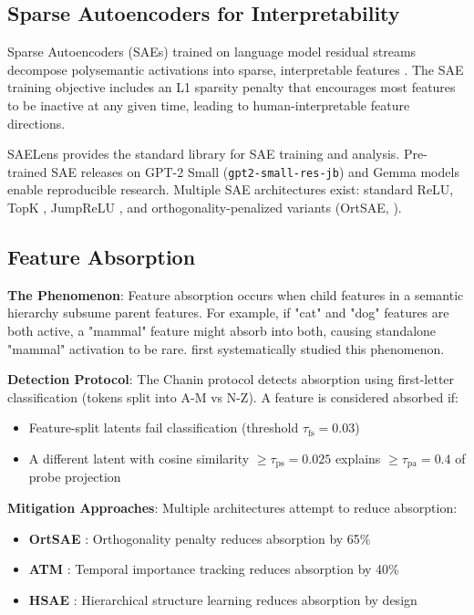 \documentclass{article}
\begin{document}
\subsection{Sparse Autoencoders for Interpretability}

Sparse Autoencoders (SAEs) trained on language model residual streams decompose polysemantic activations into sparse, interpretable features \citep{cunningham2023sparse, bricken2023training}. The SAE training objective includes an L1 sparsity penalty that encourages most features to be inactive at any given time, leading to human-interpretable feature directions.

SAELens \citep{bloom2024saelens} provides the standard library for SAE training and analysis. Pre-trained SAE releases on GPT-2 Small (\texttt{gpt2-small-res-jb}) and Gemma models enable reproducible research. Multiple SAE architectures exist: standard ReLU, TopK \citep{gao2024topk}, JumpReLU \citep{rajaminoharan2024jumprelu}, and orthogonality-penalized variants (OrtSAE, \citealt{korznikov2025ortsae}).

\subsection{Feature Absorption}

\textbf{The Phenomenon}: Feature absorption occurs when child features in a semantic hierarchy subsume parent features. For example, if "cat" and "dog" features are both active, a "mammal" feature might absorb into both, causing standalone "mammal" activation to be rare. \citet{chanin2024feature} first systematically studied this phenomenon.

\textbf{Detection Protocol}: The Chanin protocol detects absorption using first-letter classification (tokens split into A-M vs N-Z). A feature is considered absorbed if:
\begin{itemize}
  \item Feature-split latents fail classification (threshold $\tau_{\text{fs}} = 0.03$)
  \item A different latent with cosine similarity $\geq \tau_{\text{ps}} = 0.025$ explains $\geq \tau_{\text{pa}} = 0.4$ of probe projection
\end{itemize}

\textbf{Mitigation Approaches}: Multiple architectures attempt to reduce absorption:
\begin{itemize}
  \item \textbf{OrtSAE} \citep{korznikov2025ortsae}: Orthogonality penalty reduces absorption by 65\%
  \item \textbf{ATM} \citep{li2025atm}: Temporal importance tracking reduces absorption by 40\%
  \item \textbf{HSAE} \citep{luo2026hsae}: Hierarchical structure learning reduces absorption by design
\end{itemize}
\end{document}
